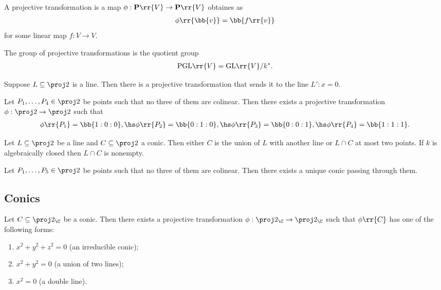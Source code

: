 \documentclass{article}
\begin{document}
\begin{definition}
  A projective transformation is a map $\phi : \mathbf P\rr{V}\to\mathbf P\rr{V}$
  obtaines as
  \begin{align*}
    \phi\rr{\bb{v}}=\bb{f\rr{v}}
  \end{align*}
  for some linear map $f:V\to V$.
\end{definition}

\begin{proposition}
  The group of projective transformations is the quotient group
  \begin{align*}
    \text{PGL}\rr{V}=\text{GL}\rr{V}/k^*.
  \end{align*}
\end{proposition}

\begin{proposition}
  Suppose $L\subseteq\proj 2$ is a line. Then there is a projective transformation that
  sends it to the line $L':x=0$.
\end{proposition}

\begin{theorem}
  Let $P_1,\ldots,P_4\in\proj 2$ be points such that no three of them are colinear. Then
  there exists a projective transformation $\phi:\proj 2\to\proj 2$ such that
  \begin{align*}
    \phi\rr{P_1}=\bb{1:0:0},\hs \phi\rr{P_2}=\bb{0:1:0}, \hs\phi\rr{P_3}=\bb{0:0:1},\hs
    \phi\rr{P_4}=\bb{1:1:1}.
  \end{align*}
\end{theorem}

\begin{corollary}
  Let $L\subseteq\proj 2$ be a line and $C\subseteq\proj 2$ a conic. Then
  either $C$ is the union of $L$ with another line or $L\cap C$ at most two points.
  If $k$ is algebraically closed then $L\cap C$ is nonempty.
\end{corollary}

\begin{corollary}
  Let $P_1,\ldots,P_5\in\proj 2$ be points such that no three of them are colinear.
  Then there exists a unique conic passing through them.
\end{corollary}

\subsection{Conics}\label{sec:conics}

\begin{theorem}
  Let $C\subseteq\proj 2_{\C}$ be a conic. Then there exists a projective transformation
  $\phi:\proj 2_{\C}\to\proj 2_{\C}$ such that $\phi\rr{C}$ has one of the following
  forms:
  \begin{enumerate}
    \item $x^2+y^2+z^2=0$ (an irreducible conic);
    \item $x^2+y^2=0$ (a union of two lines);
    \item $x^2=0$ (a double line).
  \end{enumerate}
\end{theorem}
\end{document}
